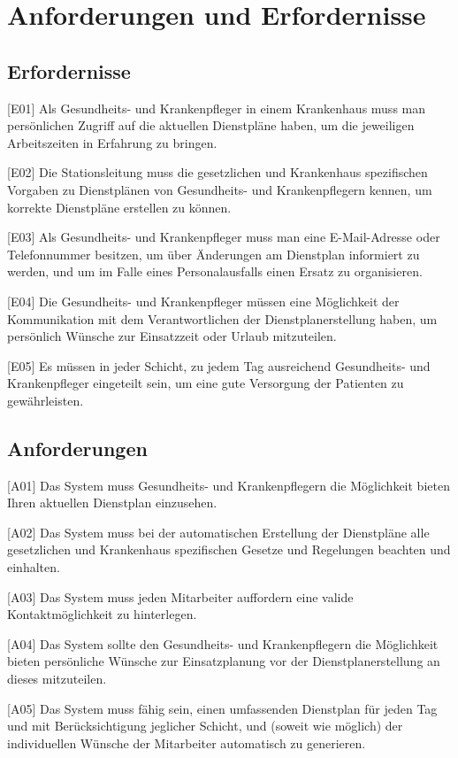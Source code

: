 \documentclass[10pt,a4paper]{article}
\begin{document}
\section{Anforderungen und Erfordernisse}
\subsection{Erfordernisse}

  [E01] Als Gesundheits- und Krankenpfleger in einem Krankenhaus muss man persönlichen Zugriff auf die aktuellen Dienstpläne haben, um die jeweiligen Arbeitszeiten in Erfahrung zu bringen.

[E02] Die Stationsleitung muss die gesetzlichen und Krankenhaus spezifischen Vorgaben zu Dienstplänen von Gesundheits- und Krankenpflegern kennen, um korrekte Dienstpläne erstellen zu können.

[E03] Als Gesundheits- und Krankenpfleger muss man eine E-Mail-Adresse oder Telefonnummer besitzen, um über Änderungen am Dienstplan informiert zu werden, und um im Falle eines Personalausfalls einen Ersatz zu organisieren.

[E04] Die Gesundheits- und Krankenpfleger müssen eine Möglichkeit der Kommunikation mit dem Verantwortlichen der Dienstplanerstellung haben, um persönlich Wünsche zur Einsatzzeit oder Urlaub mitzuteilen.

[E05] Es müssen in jeder Schicht, zu jedem Tag ausreichend Gesundheits- und Krankenpfleger eingeteilt sein, um eine gute Versorgung der Patienten zu gewährleisten.
\subsection{Anforderungen}

  [A01] Das System muss Gesundheits- und Krankenpflegern die Möglichkeit bieten Ihren aktuellen Dienstplan einzusehen.

[A02] Das System muss bei der automatischen Erstellung der Dienstpläne alle gesetzlichen und Krankenhaus spezifischen Gesetze und Regelungen beachten und einhalten.

[A03] Das System muss jeden Mitarbeiter auffordern eine valide Kontaktmöglichkeit zu hinterlegen.

[A04] Das System sollte den Gesundheits- und Krankenpflegern die Möglichkeit bieten persönliche Wünsche zur Einsatzplanung vor der Dienstplanerstellung an dieses mitzuteilen.

[A05] Das System muss fähig sein, einen umfassenden Dienstplan für jeden Tag und mit Berücksichtigung jeglicher Schicht, und (soweit wie möglich) der individuellen Wünsche der Mitarbeiter automatisch zu generieren.
\end{document}
